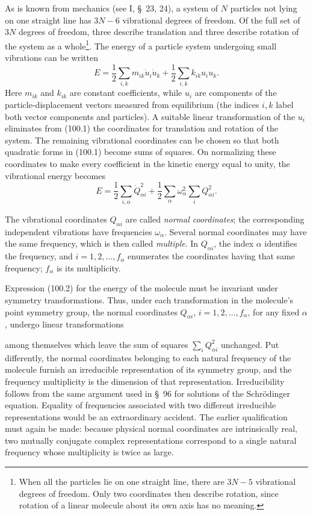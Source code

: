 As is known from mechanics (see I, \S~23, 24), a system of $N$ particles not lying on one straight line has $3N-6$ vibrational degrees of freedom. Of the full set of $3N$ degrees of freedom, three describe translation and three describe rotation of the system as a whole\footnote{When all the particles lie on one straight line, there are $3N-5$ vibrational degrees of freedom. Only two coordinates then describe rotation, since rotation of a linear molecule about its own axis has no meaning.}. The energy of a particle system undergoing small vibrations can be written
\begin{equation}
 E=\frac12\sum_{i,k}m_{ik}\dot u_i\dot u_k+\frac12\sum_{i,k}k_{ik}u_i u_k. \tag{100.1}
\end{equation}
Here $m_{ik}$ and $k_{ik}$ are constant coefficients, while $u_i$ are components of the particle-displacement vectors measured from equilibrium (the indices $i,k$ label both vector components and particles). A suitable linear transformation of the $u_i$ eliminates from (100.1) the coordinates for translation and rotation of the system. The remaining vibrational coordinates can be chosen so that both quadratic forms in (100.1) become sums of squares. On normalizing these coordinates to make every coefficient in the kinetic energy equal to unity, the vibrational energy becomes
\begin{equation}
 E=\frac12\sum_{i,\alpha}\dot Q_{\alpha i}^{2}+\frac12\sum_\alpha\omega_\alpha^2\sum_i Q_{\alpha i}^{2}. \tag{100.2}
\end{equation}

The vibrational coordinates $Q_{\alpha i}$ are called \emph{normal coordinates}; the corresponding independent vibrations have frequencies $\omega_\alpha$. Several normal coordinates may have the same frequency, which is then called \emph{multiple}. In $Q_{\alpha i}$, the index $\alpha$ identifies the frequency, and $i=1,2,\ldots,f_\alpha$ enumerates the coordinates having that same frequency; $f_\alpha$ is its multiplicity.

Expression (100.2) for the energy of the molecule must be invariant under symmetry transformations. Thus, under each transformation in the molecule's point symmetry group, the normal coordinates $Q_{\alpha i}$, $i=1,2,\ldots,f_\alpha$, for any fixed $\alpha$, undergo linear transformations

among themselves which leave the sum of squares $\sum_iQ_{\alpha i}^2$ unchanged. Put differently, the normal coordinates belonging to each natural frequency of the molecule furnish an irreducible representation of its symmetry group, and the frequency multiplicity is the dimension of that representation. Irreducibility follows from the same argument used in \S~96 for solutions of the Schrödinger equation. Equality of frequencies associated with two different irreducible representations would be an extraordinary accident. The earlier qualification must again be made: because physical normal coordinates are intrinsically real, two mutually conjugate complex representations correspond to a single natural frequency whose multiplicity is twice as large.

